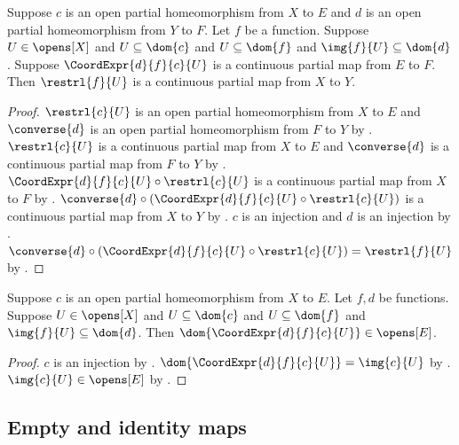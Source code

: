 \begin{theorem}\label{continuous_from_coordinate_expression}
    Suppose $c$ is an open partial homeomorphism from $X$ to $E$ and
        $d$ is an open partial homeomorphism from $Y$ to $F$.
    Let $f$ be a function.
    Suppose $U\in\opens[X]$ and $U\subseteq\dom{c}$ and $U\subseteq\dom{f}$ and
        $\img{f}{U}\subseteq\dom{d}$.
    Suppose $\CoordExpr{d}{f}{c}{U}$ is a continuous partial map from $E$ to $F$.
    Then $\restrl{f}{U}$ is a continuous partial map from $X$ to $Y$.
\end{theorem}
\begin{proof}
    $\restrl{c}{U}$ is an open partial homeomorphism from $X$ to $E$ and
        $\converse{d}$ is an open partial homeomorphism from $F$ to $Y$ by
        .
    $\restrl{c}{U}$ is a continuous partial map from $X$ to $E$ and
        $\converse{d}$ is a continuous partial map from $F$ to $Y$ by
        .
    $\CoordExpr{d}{f}{c}{U}\circ\restrl{c}{U}$ is a continuous partial map from $X$ to $F$
        by .
    $\converse{d}\circ(\CoordExpr{d}{f}{c}{U}\circ\restrl{c}{U})$
        is a continuous partial map from $X$ to $Y$ by
        .
    $c$ is an injection and $d$ is an injection by
        .
    $\converse{d}\circ(\CoordExpr{d}{f}{c}{U}\circ\restrl{c}{U})=\restrl{f}{U}$ by
        .
\end{proof}

\begin{theorem}\label{coordinate_expression_open_domain}
    Suppose $c$ is an open partial homeomorphism from $X$ to $E$.
    Let $f,d$ be functions.
    Suppose $U\in\opens[X]$ and $U\subseteq\dom{c}$ and $U\subseteq\dom{f}$ and
        $\img{f}{U}\subseteq\dom{d}$.
    Then $\dom{\CoordExpr{d}{f}{c}{U}}\in\opens[E]$.
\end{theorem}
\begin{proof}
    $c$ is an injection by
        .
    $\dom{\CoordExpr{d}{f}{c}{U}}=\img{c}{U}$ by .
    $\img{c}{U}\in\opens[E]$ by .
\end{proof}

\subsection{Empty and identity maps}

